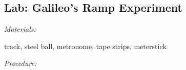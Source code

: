 \documentclass[answers]{exam}
\begin{document}
\subsection*{Lab: Galileo's Ramp Experiment}

\noindent \textit{Materials:} 
\vspace{1ex}

track, steel ball, metronome, tape strips, meterstick

\begin{center}
\end{center}

\noindent \textit{Procedure:}
\end{document}
